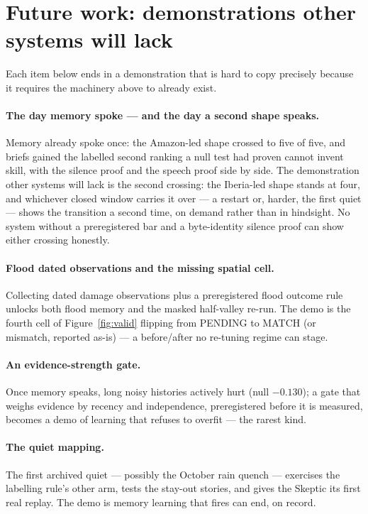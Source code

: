 \documentclass[11pt]{article}
\begin{document}
\section{Future work: demonstrations other systems will lack}
\label{sec:future}

Each item below ends in a demonstration that is hard to copy precisely
because it requires the machinery above to already exist.

\paragraph{The day memory spoke --- and the day a second shape speaks.} Memory
already spoke once: the Amazon-led shape crossed to five of five, and briefs
gained the labelled second ranking a null test had proven cannot invent skill,
with the silence proof and the speech proof side by side. The demonstration
other systems will lack is the second crossing: the Iberia-led shape stands at
four, and whichever closed window carries it over --- a restart or, harder, the
first quiet --- shows the transition a second time, on demand rather than in
hindsight. No system without a preregistered bar and a byte-identity silence
proof can show either crossing honestly.

\paragraph{Flood dated observations and the missing spatial cell.} Collecting
dated damage observations plus a preregistered flood outcome rule unlocks
both flood memory and the masked half-valley re-run. The demo is the fourth
cell of Figure~\ref{fig:valid} flipping from PENDING to MATCH (or mismatch,
reported as-is) --- a before/after no re-tuning regime can stage.

\paragraph{An evidence-strength gate.} Once memory speaks, long noisy
histories actively hurt (null $-0.130$); a gate that weighs evidence by
recency and independence, preregistered before it is measured, becomes a demo
of learning that refuses to overfit --- the rarest kind.

\paragraph{The quiet mapping.} The first archived quiet --- possibly the
October rain quench --- exercises the labelling rule's other arm, tests the
stay-out stories, and gives the Skeptic its first real replay. The demo is
memory learning that fires can end, on record.
\end{document}

